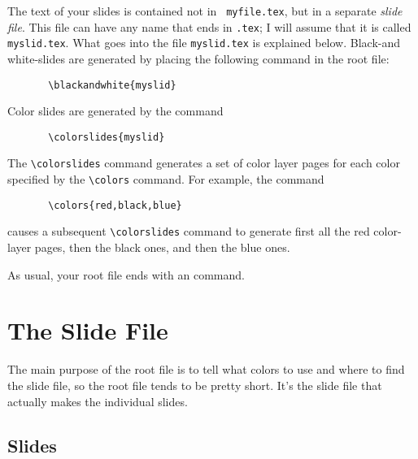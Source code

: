 The text of your slides is contained not in \xsp{}\mbox{\tt
myfile.tex}\Xsp, but in a separate {\it slide 
file}.  This file can have any name that ends in \mbox{\tt .tex}; I
will assume that it is called \xsp{}\mbox{\tt myslid.tex}\Xsp.  What
goes into the file \xsp{}\mbox{\tt myslid.tex}\xsp{} is explained
below.  Black-and white-slides are generated by placing the following
command in the root file:
\begin{verbatim}
       \blackandwhite{myslid}
\end{verbatim}
Color slides are generated by the command
\begin{verbatim}
       \colorslides{myslid}
\end{verbatim}
The \xsp{}\hbox{\verb"\colorslides"}\xsp{} command generates a set of
color layer pages for each color specified by the
\hbox{\verb"\colors"} command.  For example, the command
\begin{verbatim}
       \colors{red,black,blue}
\end{verbatim}
causes a subsequent \xsp{}\hbox{\verb"\colorslides"}\xsp{} command to
generate first all the red color-layer pages, then the black ones, and
then the blue ones.

As usual, your root file ends with an
\xsp{}\hbox{\verb""}\xsp{} command.

\section{The Slide File}

The main purpose of the root file is to tell \SLITEX{} what colors to
use and where to find the slide file, so the root file tends to be pretty
short.  It's the slide file that actually makes the individual
slides.


\subsection{Slides}

